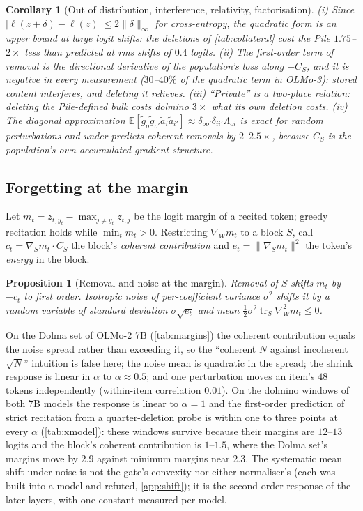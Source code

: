 \documentclass{article}
\newtheorem{proposition}{Proposition}
\newtheorem{corollary}{Corollary}
\theoremstyle{definition}\newtheorem{law}{Empirical law}
\newcommand{\E}{\mathbb{E}}
\DeclareMathOperator{\tr}{tr}
\begin{document}
\begin{corollary}[Out of distribution, interference, relativity, factorisation]\label{cor:ood}
(i) Since $|\ell(z+\delta)-\ell(z)|\le2\|\delta\|_\infty$ for cross-entropy, the quadratic form is an upper bound at large logit shifts: the deletions of \cref{tab:collateral} cost the Pile $1.75$--$2\times$ less than predicted at rms shifts of $0.4$ logits. (ii) The first-order term of removal is the directional derivative of the population's loss along $-C_S$, and it is negative in every measurement ($30$--$40\%$ of the quadratic term in OLMo-3): stored content interferes, and deleting it relieves. (iii) ``Private'' is a two-place relation: deleting the Pile-defined bulk costs dolmino $3\times$ what its own deletion costs. (iv) The diagonal approximation $\E[\tilde g_o\tilde g_{o'}\tilde a_i\tilde a_{i'}]\approx\delta_{oo'}\delta_{ii'}\Lambda_{oi}$ is exact for random perturbations and under-predicts coherent removals by $2$--$2.5\times$, because $C_S$ is the population's own accumulated gradient structure.
\end{corollary}
\label{cor:interference}

\subsection{Forgetting at the margin}

Let $m_t=z_{t,y_t}-\max_{j\ne y_t}z_{t,j}$ be the logit margin of a recited token; greedy recitation holds while $\min_tm_t>0$. Restricting $\nabla_Wm_t$ to a block $S$, call $c_t=\nabla_Sm_t\cdot C_S$ the block's \emph{coherent contribution} and $e_t=\|\nabla_Sm_t\|^2$ the token's \emph{energy} in the block.

\begin{proposition}[Removal and noise at the margin]\label{prop:margin}
Removal of $S$ shifts $m_t$ by $-c_t$ to first order. Isotropic noise of per-coefficient variance $\sigma^2$ shifts it by a random variable of standard deviation $\sigma\sqrt{e_t}$ and mean $\tfrac12\sigma^2\tr_S\nabla^2_Wm_t\le0$.
\end{proposition}
On the Dolma set of OLMo-2 7B (\cref{tab:margins}) the coherent contribution equals the noise spread rather than exceeding it, so the ``coherent $N$ against incoherent $\sqrt N$'' intuition is false here; the noise mean is quadratic in the spread; the shrink response is linear in $\alpha$ to $\alpha\approx0.5$; and one perturbation moves an item's $48$ tokens independently (within-item correlation $0.01$). On the dolmino windows of both 7B models the response is linear to $\alpha=1$ and the first-order prediction of strict recitation from a quarter-deletion probe is within one to three points at every $\alpha$ (\cref{tab:xmodel}): these windows survive because their margins are $12$--$13$ logits and the block's coherent contribution is $1$--$1.5$, where the Dolma set's margins move by $2.9$ against minimum margins near $2.3$. The systematic mean shift under noise is not the gate's convexity nor either normaliser's (each was built into a model and refuted, \cref{app:shift}); it is the second-order response of the later layers, with one constant measured per model.
\end{document}
